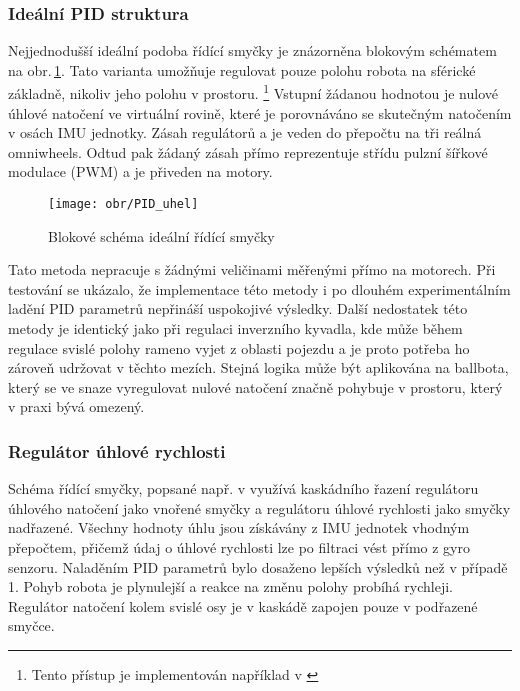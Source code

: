 \subsubsection*{Ideální PID struktura}
\label{nazdar}

Nejjednodušší ideální podoba řídící smyčky je znázorněna blokovým schématem na obr.\,\ref{simplee}. Tato varianta umožňuje regulovat pouze polohu robota na sférické základně, nikoliv jeho polohu v prostoru. \footnote{Tento přístup je implementován například v \cite{bb8}} Vstupní žádanou hodnotou je nulové úhlové natočení ve virtuální rovině, které je porovnáváno se skutečným natočením v osách IMU jednotky. Zásah regulátorů a je veden do přepočtu na tři reálná omniwheels. Odtud pak žádaný zásah přímo reprezentuje střídu pulzní šířkové modulace (PWM) a je přiveden na motory. 

\begin{figure}[htb]
\begin{center}
\texttt{[image: obr/PID\_uhel]}
\end{center}
\caption{Blokové schéma ideální řídící smyčky}
\label{simplee}
\end{figure}

Tato metoda nepracuje s žádnými veličinami měřenými přímo na motorech. Při testování se ukázalo, že implementace této metody i po dlouhém experimentálním ladění PID parametrů nepřináší uspokojivé výsledky. Další nedostatek této metody je identický jako při regulaci inverzního kyvadla, kde může během regulace svislé polohy rameno vyjet z oblasti pojezdu a je proto potřeba ho zároveň udržovat v těchto mezích. Stejná logika může být aplikována na ballbota, který se ve snaze vyregulovat nulové natočení značně pohybuje v prostoru, který v praxi bývá omezený.

\subsubsection*{Regulátor úhlové rychlosti}

Schéma řídící smyčky, popsané např. v \cite{induction} využívá kaskádního řazení regulátoru úhlového natočení jako vnořené smyčky a regulátoru úhlové rychlosti jako smyčky nadřazené. Všechny hodnoty úhlu jsou získávány z IMU jednotek vhodným přepočtem, přičemž údaj o úhlové rychlosti lze po filtraci vést přímo z gyro senzoru. Naladěním PID parametrů bylo dosaženo lepších výsledků než v případě 1. Pohyb robota je plynulejší a reakce na změnu polohy probíhá rychleji. Regulátor natočení kolem svislé osy je v kaskádě zapojen pouze v podřazené smyčce.

